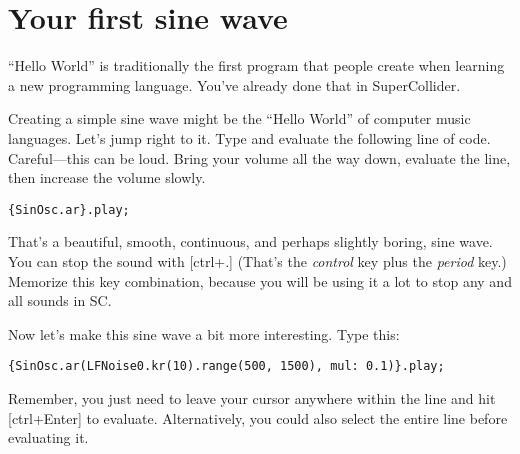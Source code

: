 \section{Your first sine wave \label{sec:first-sine}}


``Hello World'' is traditionally the first program that people create when learning a new programming language. You've already done that in SuperCollider.

Creating a simple sine wave might be the ``Hello World'' of computer music languages. Let's jump right to it. Type and evaluate the following line of code. Careful---this can be loud. Bring your volume all the way down, evaluate the line, then increase the volume slowly.

 
\begin{lstlisting}[style=SuperCollider-IDE, basicstyle=\scttfamily\footnotesize]
{SinOsc.ar}.play;
\end{lstlisting}
 

That's a beautiful, smooth, continuous, and perhaps slightly boring, sine wave. You can stop the sound with [ctrl+.] (That's the \emph{control} key plus the \emph{period} key.) Memorize this key combination, because you will be using it a lot to stop any and all sounds in SC.

\bigskip
{}
\bigskip

Now let's make this sine wave a bit more interesting. Type this:

 
\begin{lstlisting}[style=SuperCollider-IDE, basicstyle=\scttfamily\footnotesize ]
{SinOsc.ar(LFNoise0.kr(10).range(500, 1500), mul: 0.1)}.play;
\end{lstlisting}
 

Remember, you just need to leave your cursor anywhere within the line and hit [ctrl+Enter] to evaluate. Alternatively, you could also select the entire line before evaluating it.

 
\bigskip
{}